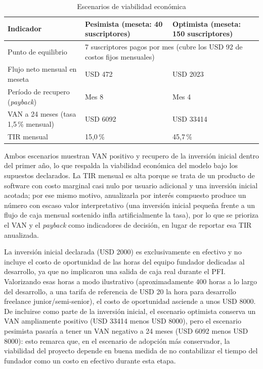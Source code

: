 \begin{table}[H]
	\centering
	\caption{Escenarios de viabilidad económica}
	\label{tab:viabilidad-economica}
	\begin{tabularx}{\textwidth}{@{}>{\raggedright\arraybackslash}p{4.4cm} X X@{}}
		\toprule
		\textbf{Indicador} & \textbf{Pesimista} (meseta: 40 suscriptores) & \textbf{Optimista} (meseta: 150 suscriptores) \\
		\midrule
		Punto de equilibrio & \multicolumn{2}{p{7.6cm}}{7 suscriptores pagos por mes (cubre los USD 92 de costos fijos mensuales)} \\
		Flujo neto mensual en meseta & USD 472 & USD 2023 \\
		Período de recupero (\emph{payback}) & Mes 8 & Mes 4 \\
		VAN a 24 meses (tasa 1,5\,\% mensual) & USD 6092 & USD 33414 \\
		TIR mensual & 15,0\,\% & 45,7\,\% \\
		\bottomrule
	\end{tabularx}
\end{table}

Ambos escenarios muestran VAN positivo y recupero de la inversión inicial dentro del primer año, lo que respalda la viabilidad económica del modelo bajo los supuestos declarados. La TIR mensual es alta porque se trata de un producto de software con costo marginal casi nulo por usuario adicional y una inversión inicial acotada; por ese mismo motivo, anualizarla por interés compuesto produce un número con escaso valor interpretativo (una inversión inicial pequeña frente a un flujo de caja mensual sostenido infla artificialmente la tasa), por lo que se prioriza el VAN y el \emph{payback} como indicadores de decisión, en lugar de reportar esa TIR anualizada.

La inversión inicial declarada (USD 2000) es exclusivamente en efectivo y no incluye el costo de oportunidad de las horas del equipo fundador dedicadas al desarrollo, ya que no implicaron una salida de caja real durante el PFI. Valorizando esas horas a modo ilustrativo (aproximadamente 400 horas a lo largo del desarrollo, a una tarifa de referencia de USD 20 la hora para desarrollo freelance junior/semi-senior), el costo de oportunidad asciende a unos USD 8000. De incluirse como parte de la inversión inicial, el escenario optimista conserva un VAN ampliamente positivo (USD 33414 menos USD 8000), pero el escenario pesimista pasaría a tener un VAN negativo a 24 meses (USD 6092 menos USD 8000): esto remarca que, en el escenario de adopción más conservador, la viabilidad del proyecto depende en buena medida de no contabilizar el tiempo del fundador como un costo en efectivo durante esta etapa.

